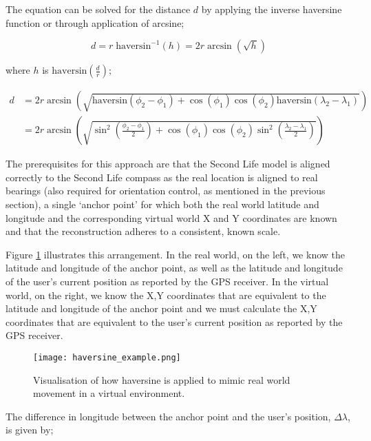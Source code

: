 The equation can be solved for the distance $d$ by applying the inverse haversine function or through application of arcsine;

\begin{equation}
	\label{haversine3}
	d = r\;\text{haversin}^{-1}\left( h \right) = 2r \arcsin \left( \sqrt{h} \right)
\end{equation}

where $h$ is $\text{haversin}\left( \frac{d}{r} \right)$;

\begin{align}
d & = 2r \arcsin\left( \sqrt{\text{haversin} \left( \phi_{2} - \phi_{1} \right) + \cos \left( \phi_{1} \right) \cos  \left( \phi_{2} \right) \text{haversin} \left( \lambda_{2} - \lambda_{1} \right) } \right) \nonumber \\ 
& = 2r \arcsin\left( \sqrt{\sin^{2} \left( \frac{\phi_{2} - \phi_{1}}{2}\right) + \cos\left( \phi_{1} \right) \cos\left( \phi_{2} \right) \sin^{2} \left( \frac{\lambda_{2} - \lambda_{1}}{2} \right) } \right)
\end{align}

The prerequisites for this approach are that the Second Life model is aligned correctly to the Second Life compass as the real location is aligned to real bearings (also required for orientation control, as mentioned in the previous section), a single `anchor point' for which both the real world latitude and longitude and the corresponding virtual world X and Y coordinates are known and that the reconstruction adheres to a consistent, known scale.

Figure \ref{haversine_example.png} illustrates this arrangement. In the real world, on the left, we know the latitude and longitude of the anchor point, as well as the latitude and longitude of the user's current position as reported by the GPS receiver. In the virtual world, on the right, we know the X,Y coordinates that are equivalent to the latitude and longitude of the anchor point and we must calculate the X,Y coordinates that are equivalent to the user's current position as reported by the GPS receiver.

\begin{figure}[h]
\centering
  \texttt{[image: haversine\_example.png]}
  \caption{Visualisation of how haversine is applied to mimic real world movement in a virtual environment.}
  \label{haversine_example.png}
\end{figure}

The difference in longitude between the anchor point and the user's position, $\Delta\lambda$, is given by;

